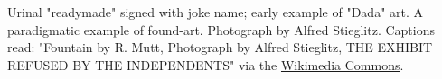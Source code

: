 Urinal "readymade" signed with joke name; early example of "Dada" art. A paradigmatic example of found-art. Photograph by Alfred Stieglitz. Captions read: "Fountain by R. Mutt, Photograph by Alfred Stieglitz, THE EXHIBIT REFUSED BY THE INDEPENDENTS" via the \href{https://commons.wikimedia.org/w/index.php?title=File:Duchamp_Fountaine.jpg&oldid=133561865}{Wikimedia Commons}.